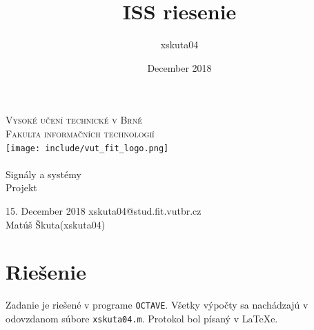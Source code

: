 \documentclass[11pt, a4paper,twocolumn]{article}
\title{ISS riesenie}
\author{xskuta04}
\date{December 2018}
\begin{document}
\begin{titlepage}

\thispagestyle{empty}
\begin{center}
\Huge
\textsc{Vysoké učení technické v Brně}\hspace{0.4em}\\
\huge{\textsc{Fakulta informačních technologií}}\\
{\texttt{[image: include/vut\_fit\_logo.png]}} \\
\hspace{0.4em}\\


\LARGE{ Signály a systémy \hspace{0.3em}}\\
\Huge {Projekt}\hspace{0.3em}\\
\end{center}
\Large{15. December 2018 \hfill
xskuta04@stud.fit.vutbr.cz \\
\null \hfill Matúš Škuta(xskuta04)}
\end{titlepage}

\section*{Riešenie}

Zadanie je riešené v programe \texttt{OCTAVE}. Všetky výpočty sa nachádzajú v odovzdanom súbore \texttt{xskuta04.m}. Protokol bol písaný v \LaTeX e.
\end{document}

